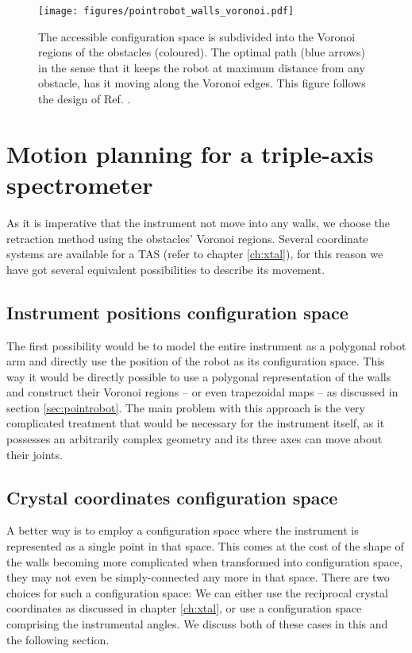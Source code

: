 \begin{figure}[htb]
	\centering
	\texttt{[image: figures/pointrobot\_walls\_voronoi.pdf]}
	\caption[Pathfinding using Voronoi diagrams.]{
		The accessible configuration space is subdivided into the Voronoi regions 
		of the obstacles (coloured). The optimal path (blue arrows) in the sense 
		that it keeps the robot at maximum distance from any obstacle, has it 
		moving along the Voronoi edges. This figure follows the design of
		Ref. \cite[Fig. 5.4.3.1, p. 247]{FUH_geo2020}.}
	\label{fig:robot_voronoi}
\end{figure}



\section{Motion planning for a triple-axis spectrometer}
\label{sec:tasrobot}

As it is imperative that the instrument not move into any walls, we choose the 
retraction method using the obstacles' Voronoi regions.
Several coordinate systems are available for a TAS (refer to chapter \ref{ch:xtal}), 
for this reason we have got several equivalent possibilities to describe its movement. 


\subsection{Instrument positions configuration space}
The first possibility would be to model the entire instrument as a polygonal 
robot arm and directly use the position of the robot as its configuration space. 
This way it would be directly possible to use a polygonal representation of the 
walls and construct their Voronoi regions -- or even trapezoidal maps -- as 
discussed in section \ref{sec:pointrobot}. The main problem with this approach 
is the very complicated treatment that would be necessary for the instrument 
itself, as it possesses an arbitrarily complex geometry and its three axes
can move about their joints.


\subsection{Crystal coordinates configuration space}
A better way is to employ a configuration space where the instrument is represented 
as a single point in that space. 
This comes at the cost of the shape of the walls becoming more complicated when 
transformed into configuration space, they may not even be simply-connected 
any more in that space. 
There are two choices for such a configuration space: We can either use the 
reciprocal crystal coordinates as discussed in chapter \ref{ch:xtal}, or use a 
configuration space comprising the instrumental angles.
We discuss both of these cases in this and the following section.

